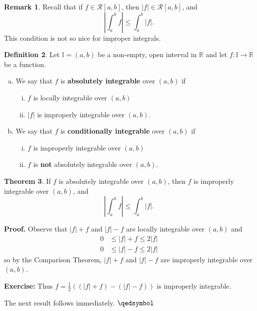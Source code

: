 \documentclass[11pt]{article}
\theoremstyle{definition}
\newtheorem{thm}{Theorem}[section]
\newtheorem{defn}[thm]{Definition}
\newtheorem{remark}[thm]{Remark}
\newcommand{\mbR}{\ensuremath{\mathbb{R}}}
\begin{document}
\begin{remark}
Recall that if $f \in \mathcal{R}[a, b]$, then $|f| \in \mathcal{R}[a, b]$, and
$$\left|\int_a^b f \right| \leq \int_a^b |f| \text{.}$$
This condition is not so nice for improper integrals.
\end{remark}

\begin{defn}
Let $\mathbb{I} = (a, b)$ be a non-empty, open interval in $\mbR$ and let $f : \mathbb{I} \to \mbR$ be a function.
\begin{enumerate}[(a)] \vspace{-0.2cm}
\item We say that $f$ is \textbf{absolutely integrable} over $(a, b)$ if
\begin{enumerate}[(i)]
\item $f$ is locally integrable over $(a, b)$
\item $|f|$ is improperly integrable over $(a, b)$.
\end{enumerate}
\item We say that $f$ is \textbf{conditionally integrable} over $(a, b)$ if
\begin{enumerate}[(i)]
\item $f$ is improperly integrable over $(a, b)$
\item $f$ is \textbf{not} absolutely integrable over $(a, b)$.
\end{enumerate}
\end{enumerate}
\end{defn}

\begin{thm}
If $f$ is absolutely integrable over $(a, b)$, then $f$ is improperly integrable over $(a, b)$, and
$$\left|\int_a^b f\right| \leq \int_a^b |f| \text{.}$$
\end{thm}
\textbf{Proof.} Observe that $|f| + f$ and $|f| - f$ are locally integrable over $(a, b)$ and
\begin{align*}
0 & \leq |f| + f \leq 2|f| \\
0 & \leq |f| - f \leq 2|f|
\end{align*}
so by the Comparison Theorem, $|f| + f$ and $|f| - f$ are improperly integrable over $(a, b)$. 

\textbf{Exercise:} Thus $f = \frac12\left((|f| + f) - (|f| - f)\right)$ is improperly integrable. 

The next result follows immediately. $\qedsymbol$

\newpage
\end{document}
